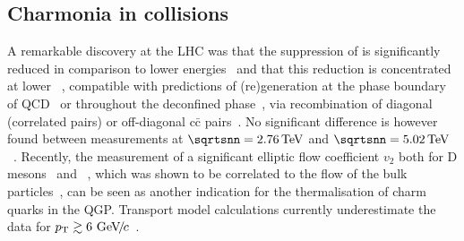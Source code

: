 \documentclass[../report.tex]{subfiles}
\begin{document}


\subsection{Charmonia in \PbPb collisions} %

A remarkable discovery at the LHC was that the suppression of \PJgy is significantly reduced in comparison to lower energies~\cite{Abelev:2012rv} and that this reduction is concentrated at lower \pT~\cite{Abelev:2013ila,Adam:2016rdg}, compatible with predictions of (re)generation at the phase boundary of QCD~\cite{BraunMunzinger:2000px} or throughout the deconfined phase~\cite{Thews:2000rj,Zhao:2011cv,Yan:2006ve}, via recombination of diagonal (correlated pairs) or off-diagonal c$\bar{\text{c}}$ pairs~\cite{Young:2008he}. No significant difference is however found between measurements at $\sqrtsnn = \unit[2.76]{TeV}$ and $\sqrtsnn = \unit[5.02]{TeV}$~\cite{Adam:2016rdg,Sirunyan:2017isk}.
Recently, the measurement of a significant elliptic flow coefficient $v_2$ both for D mesons~\cite{Abelev:2014ipa,Acharya:2017qps,Sirunyan:2017plt} and \PJgy~\cite{Khachatryan:2016ypw,ALICE:2013xna,Acharya:2017tgv,Aaboud:2018ttm}, which was shown to be correlated to the flow of the bulk particles~\cite{Acharya:2018bxo}, can be seen as another indication for the thermalisation of charm quarks in the QGP. Transport model calculations \cite{Zhou:2014kka,Du:2015wha} currently underestimate the data for $p\sb{\scriptstyle\mathrm{T}}\gtrsim 6~\text{GeV}\!/\mspace{-2mu}c$~\cite{Acharya:2017tgv,Khachatryan:2016ypw,Aaboud:2018ttm}.


\end{document}
